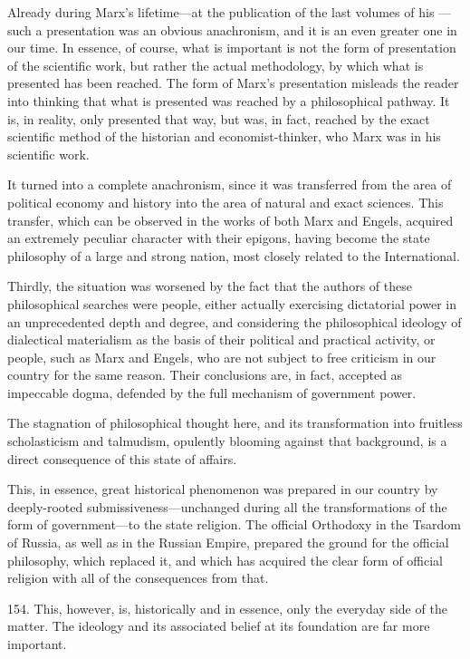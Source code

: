 Already during Marx's lifetime---at the publication of the last volumes of his
---such a presentation was an obvious anachronism, and it
is an even greater one in our time.  In essence, of course, what is important
is not the form of presentation of the scientific work, but rather the actual
methodology, by which what is presented has been reached.  The form of Marx's
presentation misleads the reader into thinking that what is presented was
reached by a philosophical pathway.  It is, in reality, only presented that
way, but was, in fact, reached by the exact scientific method of the historian
and economist-thinker, who Marx was in his scientific work.

It turned into a complete anachronism, since it was transferred from the area
of political economy and history into the area of natural and exact sciences.
This transfer, which can be observed in the works of both Marx and Engels,
acquired an extremely peculiar character with their epigons, having become the
state philosophy of a large and strong nation, most closely related to the
International.

Thirdly, the situation was worsened by the fact that the authors of these
philosophical searches were people, either actually exercising dictatorial
power in an unprecedented depth and degree, and considering the philosophical
ideology of dialectical materialism as the basis of their political and
practical activity, or people, such as Marx and Engels, who are not subject to
free criticism in our country for the same reason.  Their conclusions are, in
fact, accepted as impeccable dogma, defended by the full mechanism of
government power.

The stagnation of philosophical thought here, and its transformation into
fruitless scholasticism and talmudism, opulently blooming against that
background, is a direct consequence of this state of affairs.

This, in essence, great historical phenomenon was prepared in our country by
deeply-rooted submissiveness---unchanged during all the transformations of the
form of government---to the state religion.  The official Orthodoxy in the
Tsardom of Russia, as well as in the Russian Empire, prepared the ground for
the official philosophy, which replaced it, and which has acquired the clear
form of official religion with all of the consequences from that.

154. This, however, is, historically and in essence, only the everyday side of
the matter.  The ideology and its associated belief at its foundation are far
more important.


